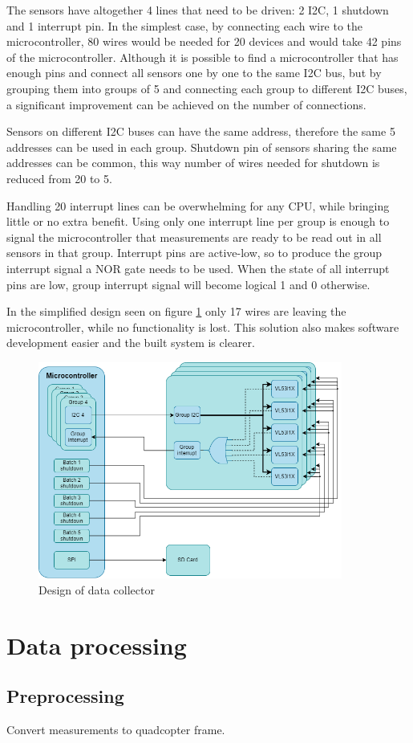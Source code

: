 The sensors have altogether 4 lines that need to be driven: 2 I2C, 1 shutdown and 1 interrupt pin.
In the simplest case, by connecting each wire to the microcontroller, 80 wires would be needed for 
20 devices and would take 42 pins of the microcontroller. Although it is possible to find a microcontroller 
that has enough pins and connect all sensors one by one to the same I2C bus, but by grouping them 
into groups of 5 and connecting each group to different I2C buses, a significant improvement can be 
achieved on the number of connections. 

Sensors on different I2C buses can have the same address, therefore the same 5 addresses can be used
in each group. Shutdown pin of sensors sharing the same addresses can be common, this way number of
wires needed for shutdown is reduced from 20 to 5.

Handling 20 interrupt lines can be overwhelming for any CPU, while bringing little or no extra
benefit. Using only one interrupt line per group is enough to signal the microcontroller that 
measurements are ready to be read out in all sensors in that group. Interrupt pins are active-low,
so to produce the group interrupt signal a NOR gate needs to be used. When the state of all interrupt
pins are low, group interrupt signal will become logical 1 and 0 otherwise.

In the simplified design seen on figure \ref{fig:data_collector} only 17 wires are leaving
the microcontroller, while no functionality is lost. This solution also makes software development
easier and the built system is clearer.


\begin{figure}[ht]
    \centering
    \includegraphics[width=100mm, keepaspectratio]{figures/data_collector.png}
    \caption{Design of data collector}
    \label{fig:data_collector}
\end{figure}


\section{Data processing}
\subsection{Preprocessing}
Convert measurements to quadcopter frame.

